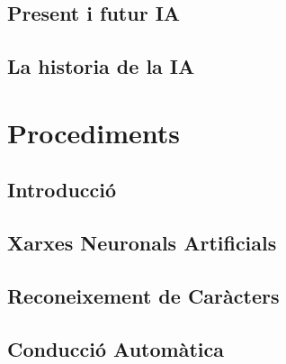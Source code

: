 \documentclass[a4paper,12pt]{report}
\begin{document}
\chapter{Present i futur IA}


\chapter{La historia de la IA}


\part{Procediments}

\chapter{Introducció}


\chapter{Xarxes Neuronals Artificials}


\chapter{Reconeixement de Caràcters}


\chapter{Conducció Automàtica}


%

\printbibliography
\end{document}

